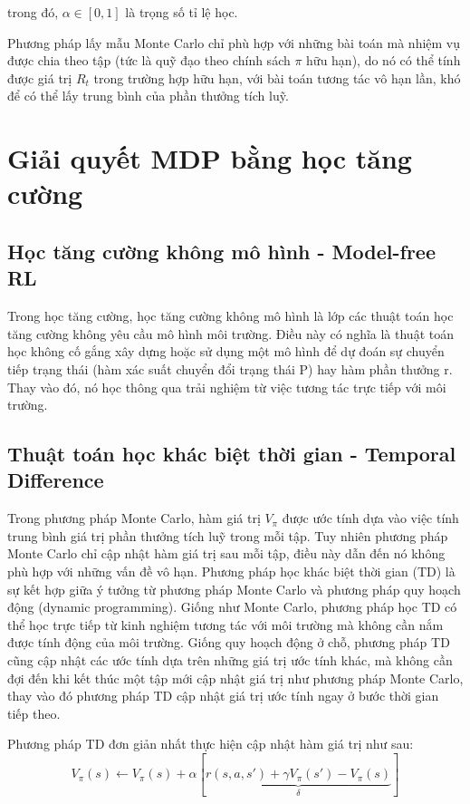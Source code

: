 \documentclass{uetgraduation}
\begin{document}
trong đó, $\alpha \in [0, 1]$ là trọng số tỉ lệ học.

Phương pháp lấy mẫu Monte Carlo chỉ phù hợp với những bài toán mà nhiệm vụ được chia theo tập (tức là quỹ đạo theo chính sách $\pi$ hữu hạn), do nó có thể tính
được giá trị $R_t$ trong trường hợp hữu hạn, với bài toán tương tác vô hạn lần, khó để có thể lấy trung bình của phần thưởng tích luỹ.

\section{Giải quyết MDP bằng học tăng cường}
\subsection{Học tăng cường không mô hình - Model-free RL}
Trong học tăng cường, học tăng cường không mô hình là lớp các thuật toán học tăng cường không yêu cầu mô hình môi trường. Điều này có nghĩa là thuật toán học
không cố gắng xây dựng hoặc sử dụng một mô hình để dự đoán sự chuyển tiếp trạng thái (hàm xác suất chuyển đổi trạng thái P) hay hàm phần thưởng r. Thay vào đó, nó học thông
qua trải nghiệm từ việc tương tác trực tiếp với môi trường.

\subsection{Thuật toán học khác biệt thời gian - Temporal Difference}
Trong phương pháp Monte Carlo, hàm giá trị $V_\pi$ được ước tính dựa vào việc tính trung bình giá trị phần thưởng tích luỹ trong mỗi tập. Tuy nhiên phương pháp Monte Carlo chỉ cập nhật
hàm giá trị sau mỗi tập, điều này dẫn đến nó không phù hợp với những vấn đề vô hạn. Phương pháp học khác biệt thời gian (TD) là sự kết hợp giữa ý tưởng từ phương pháp Monte Carlo và
phương pháp quy hoạch động (dynamic programming). Giống như Monte Carlo, phương pháp học TD có thể học trực tiếp từ kinh nghiệm tương tác với môi trường mà không cần nắm được tính
động của môi trường. Giống quy hoạch động ở chỗ, phương pháp TD cũng cập nhật các ước tính dựa trên những giá trị ước tính khác, mà không cần đợi đến khi kết thúc một tập mới cập
nhật giá trị như phương pháp Monte Carlo, thay vào đó phương pháp TD cập nhật giá trị ước tính ngay ở bước thời gian tiếp theo.

Phương pháp TD đơn giản nhất thực hiện cập nhật hàm giá trị như sau:
\begin{equation}
    V_\pi (s) \leftarrow V_\pi (s) + \alpha [\underbrace{r(s, a, s') + \gamma V_\pi (s') - V_\pi (s)}_\delta]
\end{equation}
\end{document}

